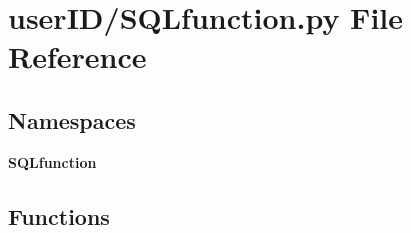 \section{user\+I\+D/\+S\+Q\+Lfunction.py File Reference}
\label{_s_q_lfunction_8py}
\subsection*{Namespaces}
\begin{DoxyCompactItemize}
\item 
 \textbf{ S\+Q\+Lfunction}
\end{DoxyCompactItemize}
\subsection*{Functions}
